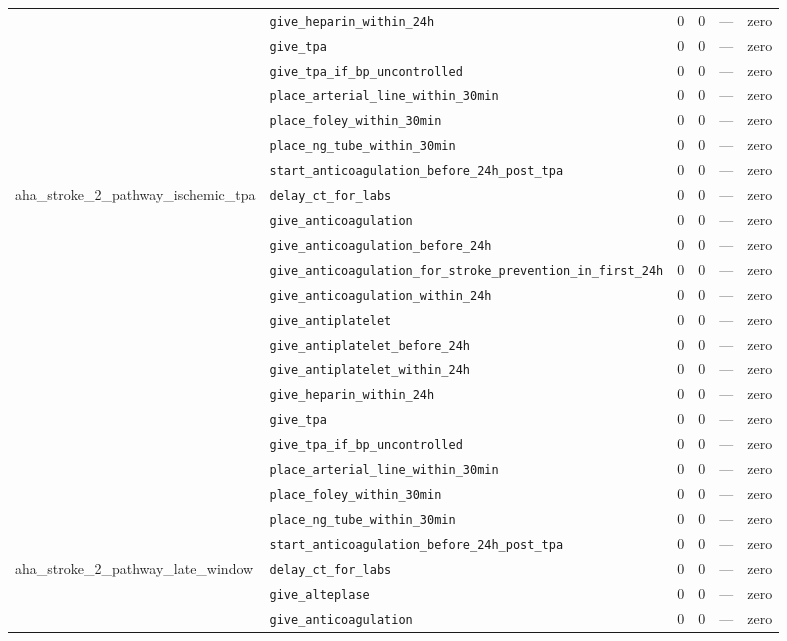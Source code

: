 \begin{table}[ht]
\begin{tabular}{llrrrl}
 & \texttt{give\_heparin\_within\_24h} & 0 & 0 & — & zero \\
 & \texttt{give\_tpa} & 0 & 0 & — & zero \\
 & \texttt{give\_tpa\_if\_bp\_uncontrolled} & 0 & 0 & — & zero \\
 & \texttt{place\_arterial\_line\_within\_30min} & 0 & 0 & — & zero \\
 & \texttt{place\_foley\_within\_30min} & 0 & 0 & — & zero \\
 & \texttt{place\_ng\_tube\_within\_30min} & 0 & 0 & — & zero \\
 & \texttt{start\_anticoagulation\_before\_24h\_post\_tpa} & 0 & 0 & — & zero \\
\midrule
aha\_stroke\_2\_pathway\_ischemic\_tpa & \texttt{delay\_ct\_for\_labs} & 0 & 0 & — & zero \\
 & \texttt{give\_anticoagulation} & 0 & 0 & — & zero \\
 & \texttt{give\_anticoagulation\_before\_24h} & 0 & 0 & — & zero \\
 & \texttt{give\_anticoagulation\_for\_stroke\_prevention\_in\_first\_24h} & 0 & 0 & — & zero \\
 & \texttt{give\_anticoagulation\_within\_24h} & 0 & 0 & — & zero \\
 & \texttt{give\_antiplatelet} & 0 & 0 & — & zero \\
 & \texttt{give\_antiplatelet\_before\_24h} & 0 & 0 & — & zero \\
 & \texttt{give\_antiplatelet\_within\_24h} & 0 & 0 & — & zero \\
 & \texttt{give\_heparin\_within\_24h} & 0 & 0 & — & zero \\
 & \texttt{give\_tpa} & 0 & 0 & — & zero \\
 & \texttt{give\_tpa\_if\_bp\_uncontrolled} & 0 & 0 & — & zero \\
 & \texttt{place\_arterial\_line\_within\_30min} & 0 & 0 & — & zero \\
 & \texttt{place\_foley\_within\_30min} & 0 & 0 & — & zero \\
 & \texttt{place\_ng\_tube\_within\_30min} & 0 & 0 & — & zero \\
 & \texttt{start\_anticoagulation\_before\_24h\_post\_tpa} & 0 & 0 & — & zero \\
\midrule
aha\_stroke\_2\_pathway\_late\_window & \texttt{delay\_ct\_for\_labs} & 0 & 0 & — & zero \\
 & \texttt{give\_alteplase} & 0 & 0 & — & zero \\
 & \texttt{give\_anticoagulation} & 0 & 0 & — & zero \\

\end{tabular}
\end{table}

